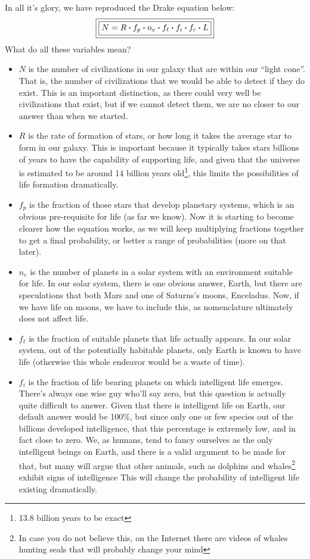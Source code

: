 \documentclass[12pt,twoside]{book}
\begin{document}
	In all it's glory, we have reproduced the Drake equation below:
	\begin{equation}
	\boxed{\boxed{N=R\vdot f_p\vdot n_e\vdot f_\ell\vdot f_i\vdot f_c\vdot L}}
	\end{equation}
	What do all these variables mean? 
	\begin{itemize}
		\item 	$N$ is the number of civilizations in our galaxy that are within our ``light cone''.  That is, the number of civilizations that we would be able to detect if they do exist.  This is an important distinction, as there could very well be civilizations that exist, but if we cannot detect them, we are no closer to our answer than when we started. 
		\item $R$ is the rate of formation of stars, or how long it takes the average star to form in our galaxy.  This is important because it typically takes stars billions of years to have the capability of supporting life, and given that the universe is estimated to be around 14 billion years old\cite{universeage}\footnote{13.8 billion years to be exact}, this limits the possibilities of life formation dramatically.
	\cite{space.com}  
	\item $f_p$ is the fraction of those stars that develop planetary systems, which is an obvious pre-requisite for life (as far we know). Now it is starting to become clearer how the equation works, as we will keep multiplying fractions together to get a final probability, or better a range of probabilities (more on that later).
	\item $n_e$ is the number of planets in a solar system with an environment suitable for life.  In our solar system, there is one obvious answer, Earth, but there are speculations that both Mars and one of Saturns's moons, Enceladus\cite{lifenasa}.  Now, if we have life on moons, we have to include this, as nomenclature ultimately does not affect life.
	\item $f_\ell$ is the fraction of suitable planets that life actually appears.  In our solar system, out of the potentially habitable planets, only Earth is known to have life (otherwise this whole endeavor would be a waste of time).  
	\item $f_i$ is the fraction of life bearing planets on which intelligent life emerges.  There's always one wise guy who'll say zero, but this question is actually quite difficult to answer. Given that there is intelligent life on Earth, our default answer would be 100\%, but since only one or few species out of the billions developed intelligence, that this percentage is extremely low, and in fact close to zero.  We, as humans, tend to fancy ourselves as the only intelligent beings on Earth, and there is a valid argument to be made for that, but many will argue that other animals, such as dolphins and whales\footnote{In case you do not believe this, on the Internet there are videos of whales hunting seals that will probably change your mind}  exhibit signs of intelligence\cite{dolphinssmart}   This will change the probability of intelligent life existing dramatically.

\end{itemize}
\end{document}
